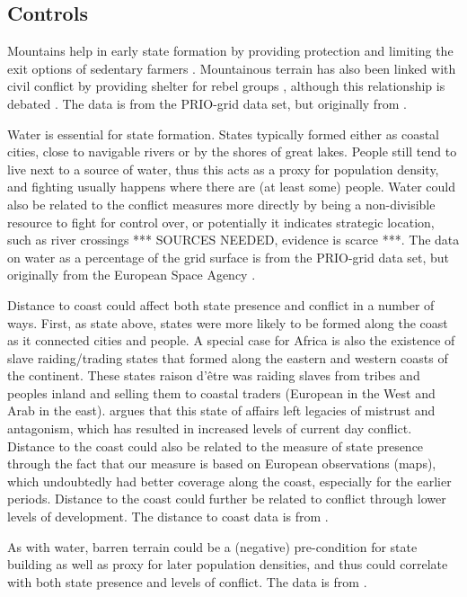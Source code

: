 \documentclass[12pt]{article}
\begin{document}
\subsection{Controls}

Mountains help in early state formation by providing protection and limiting the
exit options of sedentary farmers \citep{Carneiro1988}. Mountainous terrain has
also been linked with civil conflict by providing shelter for rebel groups
\citep{Hegre2006}, although this relationship is debated 
\citep{Buhaug2002}. The data is from the PRIO-grid data set, but originally 
from \citet{Blyth2002}. 

Water is essential for state formation. States typically formed either as
coastal cities, close to navigable rivers or by the shores of great lakes.
People still tend to live next to a source of water, thus this acts as a proxy
for population density, and fighting usually happens where there are (at least
some) people.  Water could also be related to the conflict measures more
directly by being a non-divisible resource to fight for control over, or
potentially it indicates strategic location, such as river crossings *** SOURCES
NEEDED, evidence is scarce ***. The data on water as a percentage of the grid
surface is from the PRIO-grid data set, but originally from the European Space
Agency \citep{Bontemps2009}.

Distance to coast could affect both state presence and conflict in a number of
ways. First, as state above, states were more likely to be formed along the
coast as it connected cities and people. A special case for Africa is also the
existence of slave raiding/trading states that formed along the eastern and
western coasts of the continent. These states raison d'être was raiding slaves
from tribes and peoples inland and selling them to coastal traders (European in
the West and Arab in the east). \citet{Nunn2008} argues that this state of
affairs left legacies of mistrust and antagonism, which has resulted in
increased levels of current day conflict. Distance to the coast could also be
related to the measure of state presence through the fact that our measure is
based on European observations (maps), which undoubtedly had better coverage
along the coast, especially for the earlier periods. Distance to the coast could
further be related to conflict through lower levels of development. The distance
to coast data is from \citet{Wessel1996}.

As with water, barren terrain could be a (negative) pre-condition for state
building as well as proxy for later population densities, and thus could
correlate with both state presence and levels of conflict. The data is from
\citet{Bontemps2009}.
\end{document}
